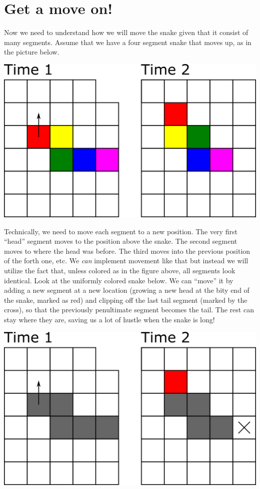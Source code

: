 \documentclass[
]{book}
\begin{document}
\hypertarget{get-a-move-on}{%
\section{Get a move on!}\label{get-a-move-on}}

Now we need to understand how we will move the snake given that it consist of many segments. Assume that we have a four segment snake that moves up, as in the picture below.

\includegraphics[width=14.36in]{images/snake-movement}

Technically, we need to move each segment to a new position. The very first ``head'' segment moves to the position above the snake. The second segment moves to where the head was before. The third moves into the previous position of the forth one, etc. We \emph{can} implement movement like that but instead we will utilize the fact that, unless colored as in the figure above, all segments look identical. Look at the uniformly colored snake below. We can ``move'' it by adding a new segment at a new location (growing a new head at the bity end of the snake, marked as red) and clipping off the last tail segment (marked by the cross), so that the previously penultimate segment becomes the tail. The rest can stay where they are, saving us a lot of hustle when the snake is long!

\includegraphics[width=14.36in]{images/snake-movement-2}
\end{document}
